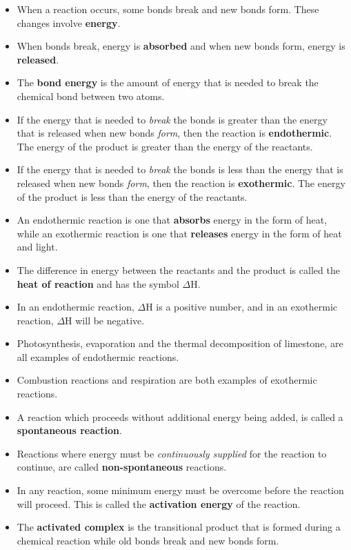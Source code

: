 
\begin{itemize}
\item{When a reaction occurs, some bonds break and new bonds form. These changes involve \textbf{energy}.}
\item{When bonds break, energy is \textbf{absorbed} and when new bonds form, energy is \textbf{released}.}
\item{The \textbf{bond energy} is the amount of energy that is needed to break the chemical bond between two atoms.}
\item{If the energy that is needed to \textit{break} the bonds is greater than the energy that is released when new bonds \textit{form}, then the reaction is \textbf{endothermic}. The energy of the product is greater than the energy of the reactants.}
\item{If the energy that is needed to \textit{break} the bonds is less than the energy that is released when new bonds \textit{form}, then the reaction is \textbf{exothermic}. The energy of the product is less than the energy of the reactants.}
\item{An endothermic reaction is one that \textbf{absorbs} energy in the form of heat, while an exothermic reaction is one that \textbf{releases} energy in the form of heat and light.}
\item{The difference in energy between the reactants and the product is called the \textbf{heat of reaction} and has the symbol $\Delta$H.}
\item{In an endothermic reaction, $\Delta$H is a positive number, and in an exothermic reaction, $\Delta$H will be negative.}
\item{Photosynthesis, evaporation and the thermal decomposition of limestone, are all examples of endothermic reactions.}
\item{Combustion reactions and respiration are both examples of exothermic reactions.}
\item{A reaction which proceeds without additional energy being added, is called a \textbf{spontaneous reaction}.}
\item{Reactions where energy must be \textit{continuously supplied} for the reaction to continue, are called \textbf{non-spontaneous} reactions.}
\item{In any reaction, some minimum energy must be overcome before the reaction will proceed. This is called the \textbf{activation energy} of the reaction.}
\item{The \textbf{activated complex} is the transitional product that is formed during a chemical reaction while old bonds break and new bonds form.}
\end{itemize}

